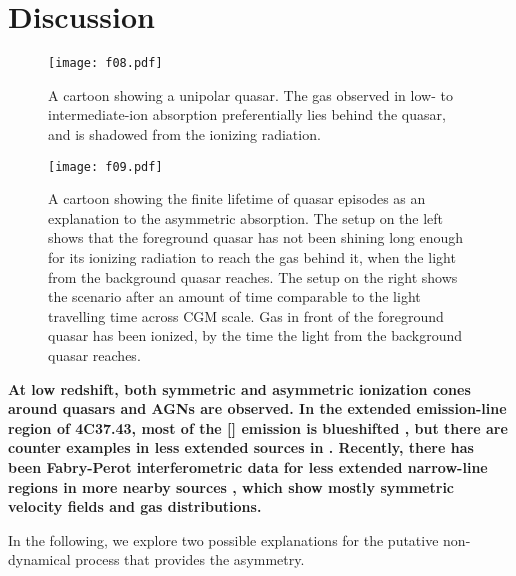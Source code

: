 \documentclass[iop]{emulateapj}
\begin{document}
{\section{Discussion}
\label{sec:discussion}

\begin{figure*}[!th]
\begin{minipage}[!bp]{0.28\textwidth}
\texttt{[image: f08.pdf]}
\caption{A cartoon showing a unipolar quasar. The gas observed in low- to intermediate-ion 
absorption preferentially lies behind the quasar, and is shadowed from the ionizing radiation. 
}
\label{fig:monopolar}
\end{minipage}%
\hspace{0.3in}
\begin{minipage}[!bp]{0.67\textwidth}
\texttt{[image: f09.pdf]}
\caption{A cartoon showing the finite lifetime of quasar episodes as an explanation to the 
asymmetric absorption. The setup on the left shows that the foreground quasar has not been shining 
long enough for its ionizing radiation to reach the gas behind it, when the light from the 
background quasar reaches. The setup on the right shows the scenario after an amount of time 
comparable to the light travelling time across CGM scale. Gas in front of the foreground quasar 
has been ionized, by the time the light from the background quasar reaches. 
}
\label{fig:lighttravel}
\end{minipage}
\end{figure*}

{\bf At low redshift, both symmetric and asymmetric ionization cones around quasars and AGNs are
observed. In the extended emission-line region of 4C37.43, most of the [] emission is
blueshifted \citep{FuStockton07}, but there are counter examples in less extended sources in
\cite{FuStockton09}. Recently, there has been Fabry-Perot interferometric data for less extended
narrow-line regions in more nearby sources \citep{Keel+15,Keel+17}, which show mostly symmetric
velocity fields and gas distributions.}

In the following, we explore two possible explanations for the putative non-dynamical process that
provides the asymmetry.

}
\end{document}

